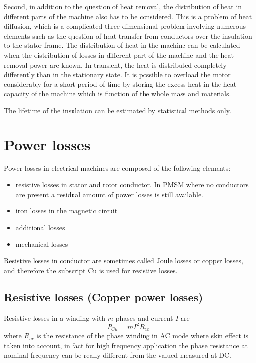 \documentclass[11pt,a4paper,oneside]{book}
\begin{document}
\begin{onehalfspace}
Second, in addition to the question of heat removal, the distribution of heat in different parts of the machine also has to be considered. This is a problem of heat diffusion, which is a complicated three-dimensional problem involving numerous elements such as the question of heat transfer from conductors over the insulation to the stator frame. The distribution of heat in the machine can be calculated when the distribution of losses in different part of the machine and the heat removal power are known. In transient, the heat is distributed completely differently than in the stationary state. It is possible to overload the motor considerably for a short period of time by storing the excess heat in the heat capacity of the machine which is function of the whole mass and materials.

The lifetime of the insulation can be estimated by statistical methods only. 

\section{Power losses}
Power losses in electrical machines are composed of the following elements:
\begin{itemize}
	\item resistive losses in stator and rotor conductor. In PMSM where no conductors are present a residual amount of power losses is still available.
	\item iron losses in the magnetic circuit
	\item additional losses
	\item mechanical losses
\end{itemize}

Resistive losses in conductor are sometimes called Joule losses or copper losses, and therefore the subscript Cu is used for resistive losses.

\subsection{Resistive losses (Copper power losses)}
Resistive losses in a winding with $m$ phases and current $I$ are
\begin{equation}
	P_{Cu}=mI^2R_{ac}
\end{equation}
where $R_{ac}$ is the resistance of the phase winding in AC mode where skin effect is taken into account, in fact for high frequency application the phase resistance at nominal frequency can be really different from the valued measured at DC.


\end{onehalfspace}
\end{document}
